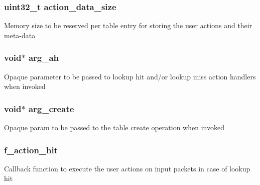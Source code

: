 \subsubsection[{action\+\_\+data\+\_\+size}]{\setlength{\rightskip}{0pt plus 5cm}uint32\+\_\+t action\+\_\+data\+\_\+size}\label{structrte__pipeline__table__params_a2e23c737ba77e1f57ba715520171f00a}
Memory size to be reserved per table entry for storing the user actions and their meta-\/data \hypertarget{structrte__pipeline__table__params_adfcedab79c75f0129bd5382cf3d48b13}{}
\subsubsection[{arg\+\_\+ah}]{\setlength{\rightskip}{0pt plus 5cm}void$\ast$ arg\+\_\+ah}\label{structrte__pipeline__table__params_adfcedab79c75f0129bd5382cf3d48b13}
Opaque parameter to be passed to lookup hit and/or lookup miss action handlers when invoked \hypertarget{structrte__pipeline__table__params_ab34a217f23d1f5a27ae00e3fbbba445c}{}
\subsubsection[{arg\+\_\+create}]{\setlength{\rightskip}{0pt plus 5cm}void$\ast$ arg\+\_\+create}\label{structrte__pipeline__table__params_ab34a217f23d1f5a27ae00e3fbbba445c}
Opaque param to be passed to the table create operation when invoked \hypertarget{structrte__pipeline__table__params_ab2a1d1ad3795cb39f148a392343dce07}{}
\subsubsection[{f\+\_\+action\+\_\+hit}]{ f\+\_\+action\+\_\+hit}\label{structrte__pipeline__table__params_ab2a1d1ad3795cb39f148a392343dce07}
Callback function to execute the user actions on input packets in case of lookup hit \hypertarget{structrte__pipeline__table__params_aaa5e9294a7d2b1c271683726263fcb46}{}
